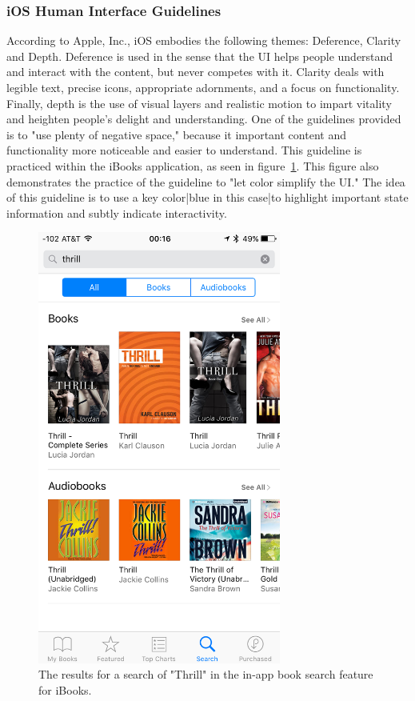 \documentclass[journal, a4paper]{IEEEtran}
\begin{document}
\subsubsection{iOS Human Interface Guidelines}
	According to Apple, Inc., iOS embodies the following themes: Deference, Clarity and Depth. Deference is used in the sense that the UI helps people understand and interact with the content, but never competes with it. Clarity deals with legible text, precise icons, appropriate adornments, and a focus on functionality. Finally, depth is the use of visual layers and realistic motion to impart vitality and heighten people's delight and understanding. 
    One of the guidelines provided is to "use plenty of negative space," because it important content and functionality more noticeable and easier to understand. This guideline is practiced within the iBooks application, as seen in figure~\ref{fig:ibooksDownload}. This figure also demonstrates the practice of the guideline to "let color simplify the UI." The idea of this guideline is to use a key color|blue in this case|to highlight important state information and subtly indicate interactivity.
    
    \begin{figure}[!hbt]
		\begin{center}
		\includegraphics[width=8cm]{ibooksDownload}
		\caption{The results for a search of "Thrill" in the in-app book search feature for iBooks.}
		\label{fig:ibooksDownload}
		\end{center}
	\end{figure}
    
\end{document}
